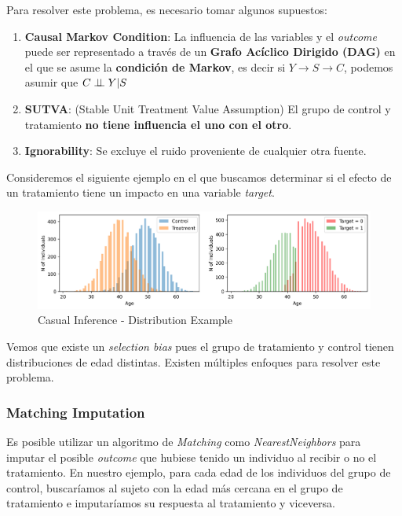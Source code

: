 Para resolver este problema, es necesario tomar algunos supuestos: 
\begin{enumerate}
    \item \textbf{Causal Markov Condition}: La influencia de las variables y el \textit{outcome} puede ser representado a través de un \textbf{Grafo Acíclico Dirigido (DAG)} en el que se asume la \textbf{condición de Markov}, es decir si $Y \rightarrow S \rightarrow C$, podemos asumir que $C \perp \!\!\! \perp Y | S$
    \item \textbf{SUTVA}: (Stable Unit Treatment Value Assumption) El grupo de control y tratamiento \textbf{no tiene influencia el uno con el otro}. 
    \item \textbf{Ignorability}: Se excluye el ruido proveniente de cualquier otra fuente. 
\end{enumerate}

Consideremos el siguiente ejemplo en el que buscamos determinar si el efecto de un tratamiento tiene un impacto en una variable \textit{target}. 

\begin{figure}[H]
    \center
    \includegraphics[scale=0.5]{notebooks/STATS/img/causal_inference_age_distribution.png}
    \caption{Casual Inference - Distribution Example}
\end{figure}

Vemos que existe un \textit{selection bias} pues el grupo de tratamiento y control tienen distribuciones de edad distintas. Existen múltiples enfoques para resolver este problema. 

\subsubsection{Matching Imputation}

Es posible utilizar un algoritmo de \textit{Matching} como \textit{NearestNeighbors} para imputar el posible \textit{outcome} que hubiese tenido un individuo al recibir o no el tratamiento. En nuestro ejemplo, para cada edad de los individuos del grupo de control, buscaríamos al sujeto con la edad más cercana en el grupo de tratamiento e imputaríamos su respuesta al tratamiento y viceversa. 

